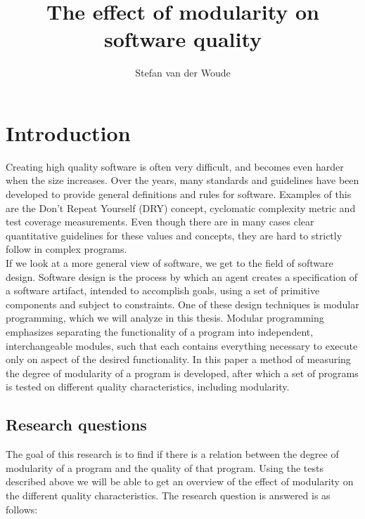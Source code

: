 \documentclass[twoside]{uva-inf-bachelor-thesis}
\title{The effect of modularity on software quality}
\author{Stefan van der Woude}
\begin{document}
\maketitle

\begin{abstract}

\end{abstract}

\tableofcontents


\chapter{Introduction}
Creating high quality software is often very difficult, and becomes even harder when the size increases. Over the years, many standards and guidelines have been developed to provide general definitions and rules for software. Examples of this are the Don't Repeat Yourself (DRY) concept, cyclomatic complexity metric and test coverage measurements. Even though there are in many cases clear quantitative guidelines for these values and concepts, they are hard to strictly follow in complex programs.\\

If we look at a more general view of software, we get to the field of software design. Software design is the process by which an agent creates a specification of a software artifact, intended to accomplish goals, using a set of primitive components and subject to constraints. One of these design techniques is modular programming, which we will analyze in this thesis. Modular programming emphasizes separating the functionality of a program into independent, interchangeable modules, such that each contains everything necessary to execute only on aspect of the desired functionality. In this paper a method of measuring the degree of modularity of a program is developed, after which a set of programs is tested on different quality characteristics, including modularity.

\section{Research questions}
The goal of this research is to find if there is a relation between the degree of modularity of a program and the quality of that program. Using the tests described above we will be able to get an overview of the effect of modularity on the different quality characteristics. The research question is answered is as follows:
\end{document}
